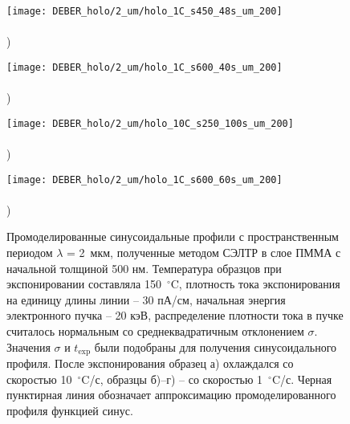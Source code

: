 \begin{figure}[h!]
	\begin{minipage}{0.48\textwidth}
		\texttt{[image: DEBER\_holo/2\_um/holo\_1C\_s450\_48s\_um\_200]} \\
		\vspace{-12em} \\ ) \\ \vspace{12em}
	\end{minipage}
	\begin{minipage}{0.48\textwidth}
		\texttt{[image: DEBER\_holo/2\_um/holo\_1C\_s600\_40s\_um\_200]} \\
		\vspace{-12em} \\ ) \\ \vspace{12em}
	\end{minipage}
	
	\vspace{-3.5em}
	
	\begin{minipage}{0.48\textwidth}
		\texttt{[image: DEBER\_holo/2\_um/holo\_10C\_s250\_100s\_um\_200]} \\
		\vspace{-12em} \\ ) \\ \vspace{12em}
	\end{minipage}
	\begin{minipage}{0.48\textwidth}
		\texttt{[image: DEBER\_holo/2\_um/holo\_1C\_s600\_60s\_um\_200]} \\
		\vspace{-12em} \\ ) \\ \vspace{12em}
	\end{minipage}
	\vspace{-3.5em}
	\caption{Промоделированные синусоидальные профили с пространственным периодом $\lambda$ = 2~мкм, полученные методом СЭЛТР в слое ПММА с начальной толщиной 500 нм. Температура образцов при экспонировании составляла 150~$^\circ$C, плотность тока экспонирования на единицу длины линии -- 30 пА/см, начальная энергия электронного пучка -- 20 кэВ, распределение плотности тока в пучке считалось нормальным со среднеквадратичным отклонением $\sigma$. Значения $\sigma$ и $t_\mathrm{exp}$ были подобраны для получения синусоидального профиля. После экспонирования образец а) охлаждался со скоростью 10~$^\circ$C/с, образцы б)--г) -- со скоростью 1~$^\circ$C/с. Черная пунктирная линия обозначает аппроксимацию промоделированного профиля функцией синус.}
	\label{fig:DEBER_holo_2um}
\end{figure}

